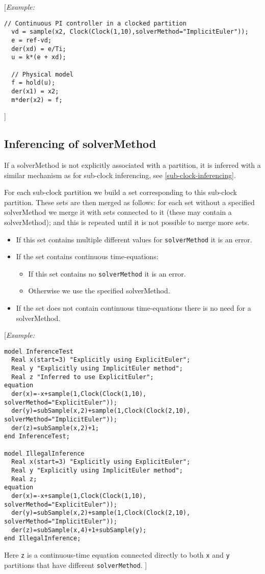 {[}\emph{Example:}
\begin{lstlisting}[language=modelica]
  // Continuous PI controller in a clocked partition
  vd = sample(x2, Clock(Clock(1,10),solverMethod="ImplicitEuler"));
  e = ref-vd;
  der(xd) = e/Ti;
  u = k*(e + xd);

  // Physical model
  f = hold(u);
  der(x1) = x2;
  m*der(x2) = f;
\end{lstlisting}
{]}

\subsection{Inferencing of solverMethod}

If a solverMethod is not explicitly associated with a partition, it is
inferred with a similar mechanism as for sub-clock inferencing, see
\autoref{sub-clock-inferencing}. 

For each sub-clock partition we build a set corresponding to this sub-clock partition.
These sets are then merged as follows: for each set without a specified solverMethod we merge it 
with sets connected to it (these may contain a solverMethod); and this is repeated until it is not possible to merge more sets.

\begin{itemize}
\item If this set contains multiple different values for \lstinline!solverMethod! it is an error.
\item If the set contains continuous time-equations:
\begin{itemize} 
\item If this set contains no \lstinline!solverMethod! it is an error.
\item Otherwise we use the specified solverMethod.
\end{itemize}
\item If the set does not contain continuous time-equations there is no need for a solverMethod.
\end{itemize}

{[}\emph{Example:}

\begin{lstlisting}[language=modelica]
model InferenceTest
  Real x(start=3) "Explicitly using ExplicitEuler";
  Real y "Explicitly using ImplicitEuler method";
  Real z "Inferred to use ExplicitEuler";
equation 
  der(x)=-x+sample(1,Clock(Clock(1,10), solverMethod="ExplicitEuler"));
  der(y)=subSample(x,2)+sample(1,Clock(Clock(2,10), solverMethod="ImplicitEuler"));
  der(z)=subSample(x,2)+1;
end InferenceTest;

model IllegalInference
  Real x(start=3) "Explicitly using ExplicitEuler";
  Real y "Explicitly using ImplicitEuler method";
  Real z;
equation 
  der(x)=-x+sample(1,Clock(Clock(1,10), solverMethod="ExplicitEuler"));
  der(y)=subSample(x,2)+sample(1,Clock(Clock(2,10), solverMethod="ImplicitEuler"));
  der(z)=subSample(x,4)+1+subSample(y);
end IllegalInference;
\end{lstlisting}
Here \lstinline!z! is a continuous-time equation connected directly to both \lstinline!x! and \lstinline!y! partitions that have different \lstinline!solverMethod!.
{]}

